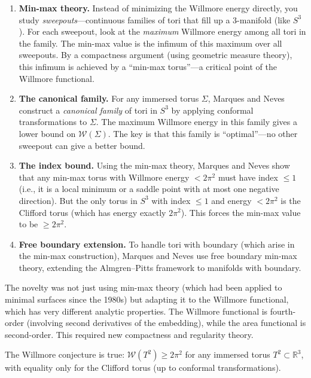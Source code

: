 \begin{enumerate}
\item \textbf{Min-max theory.} Instead of minimizing the Willmore energy directly, you study \emph{sweepouts}---continuous families of tori that fill up a 3-manifold (like $S^3$). For each sweepout, look at the \emph{maximum} Willmore energy among all tori in the family. The min-max value is the infimum of this maximum over all sweepouts. By a compactness argument (using geometric measure theory), this infimum is achieved by a ``min-max torus''---a critical point of the Willmore functional.

\item \textbf{The canonical family.} For any immersed torus $\Sigma$, Marques and Neves construct a \emph{canonical family} of tori in $S^3$ by applying conformal transformations to $\Sigma$. The maximum Willmore energy in this family gives a lower bound on $\mathcal{W}(\Sigma)$. The key is that this family is ``optimal''---no other sweepout can give a better bound.

\item \textbf{The index bound.} Using the min-max theory, Marques and Neves show that any min-max torus with Willmore energy $< 2\pi^2$ must have index $\le 1$ (i.e., it is a local minimum or a saddle point with at most one negative direction). But the only torus in $S^3$ with index $\le 1$ and energy $< 2\pi^2$ is the Clifford torus (which has energy exactly $2\pi^2$). This forces the min-max value to be $\ge 2\pi^2$.

\item \textbf{Free boundary extension.} To handle tori with boundary (which arise in the min-max construction), Marques and Neves use free boundary min-max theory, extending the Almgren--Pitts framework to manifolds with boundary.
\end{enumerate}

The novelty was not just using min-max theory (which had been applied to minimal surfaces since the 1980s) but adapting it to the Willmore functional, which has very different analytic properties. The Willmore functional is fourth-order (involving second derivatives of the embedding), while the area functional is second-order. This required new compactness and regularity theory.

\begin{theorem}
The Willmore conjecture is true: $\mathcal{W}(T^2) \ge 2\pi^2$ for any immersed torus $T^2 \subset \mathbb{R}^3$, with equality only for the Clifford torus (up to conformal transformations).
\end{theorem}

